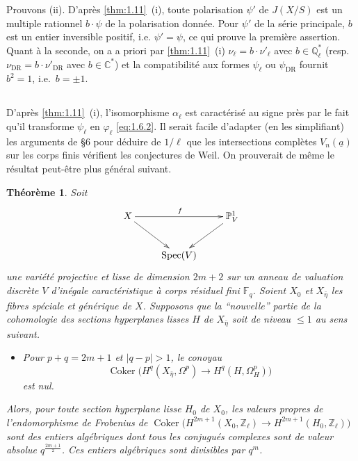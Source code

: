 \documentclass[10pt,leqno]{amsart}
\theoremstyle{plain}
\newtheorem{theorem}{Th\'eor\`eme}
\theoremstyle{definition}
\theoremstyle{remark}
\DeclareMathOperator{\Spec}{Spec}
\DeclareMathOperator{\Coker}{Coker}
\newcommand{\ZZ}{\mathbb{Z}}
\newcommand{\QQ}{\mathbb{Q}}
\newcommand{\CC}{\mathbb{C}}
\newcommand{\PP}{\mathbb{P}}
\newcommand{\FF}{\mathbb{F}}
\newcommand{\ua}{\underline{a}}
\begin{document}
Prouvons (ii). D'apr\`es \ref{thm:1.11}~(i), toute polarisation $\psi'$ de $J(X/S)$ est un multiple rationnel $b\cdot\psi$ de la polarisation donn\'ee. Pour $\psi'$ de la s\'erie principale, $b$ est un entier inversible positif, i.e. $\psi'=\psi$, ce qui prouve la premi\`ere assertion. Quant \`a la seconde, on a a priori par \ref{thm:1.11}~(i) $\nu_\ell=b\cdot\nu'_\ell$ avec $b\in\QQ_\ell^*$ (resp.~$\nu_{\mathrm{DR}}=b\cdot\nu'_{\mathrm{DR}}$ avec $b\in\CC^*$) et la compatibilit\'e aux formes $\psi_\ell$ ou $\psi_{\mathrm{DR}}$ fournit $b^2=1$, i.e.~$b=\pm 1$.

\subsection{}\label{1.12}

D'apr\`es \ref{thm:1.11}~(i), l'isomorphisme $\alpha_\ell$ est caract\'eris\'e au signe pr\`es par le fait qu'il transforme $\psi_\ell$ en $\varphi_\ell$ \eqref{eq:1.6.2}. Il serait facile d'adapter (en les simplifiant) les arguments de \cite{4} \S6 pour d\'eduire de $1/\ell$ que les intersections compl\`etes $V_n(\ua)$ sur les corps finis v\'erifient les conjectures de Weil. On prouverait de m\^eme le r\'esultat peut-\^etre plus g\'en\'eral suivant.

\begin{theorem}\label{thm:1.13}
Soit
\[
\xymatrix{
X \ar[rr]^{f} \ar[rd] & & \PP^1_V \ar[ld] \\
& \Spec(V) &
}
\]
une vari\'et\'e projective et lisse de dimension $2m+2$ sur un anneau de valuation discr\`ete $V$ d'in\'egale caract\'eristique \`a corps r\'esiduel fini $\FF_q$. Soient $X_0$ et $X_{\bar{\eta}}$ les fibres sp\'eciale et g\'en\'erique de $X$. Supposons que la ``nouvelle'' partie de la cohomologie des sections hyperplanes lisses $H$ de $X_{\bar{\eta}}$ soit de niveau $\le 1$ au sens suivant.
\begin{itemize}
\item[$(*)$] Pour $p+q=2m+1$ et $|q-p|>1$, le conoyau
\[
\Coker\bigl(H^q(X_{\bar{\eta}},\Omega^p)\to H^q(H,\Omega^p_H)\bigr)
\]
est nul.
\end{itemize}
Alors, pour toute section hyperplane lisse $H_0$ de $X_0$, les valeurs propres de l'endomorphisme de Frobenius de $\Coker\bigl(H^{2m+1}(X_0,\ZZ_\ell)\to H^{2m+1}(H_0,\ZZ_\ell)\bigr)$ sont des entiers alg\'ebriques dont tous les conjugu\'es complexes sont de valeur absolue $q^{\frac{2m+1}{2}}$. Ces entiers alg\'ebriques sont divisibles par $q^m$.
\end{theorem}
\end{document}
